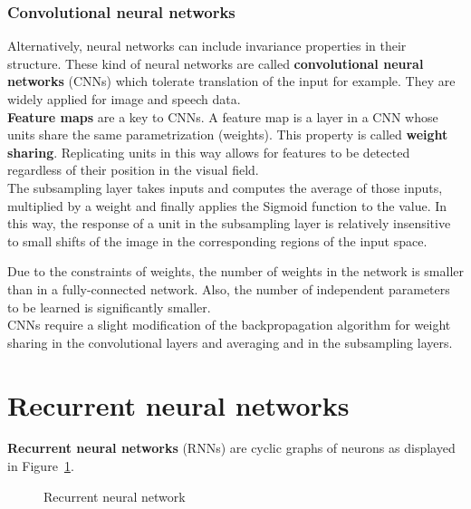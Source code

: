 \documentclass{report}
\begin{document}
\subsubsection{Convolutional neural networks}
Alternatively, neural networks can include invariance properties in their structure.
These kind of neural networks are called {\bf convolutional neural networks} (CNNs) which tolerate translation of the input for example.
They are widely applied for image and speech data. \\
{\bf Feature maps} are a key to CNNs. A feature map is a layer in a CNN whose units share the same parametrization (weights). This property is called {\bf weight sharing}.
Replicating units in this way allows for features to be detected regardless of their position in the visual field.\\
The subsampling layer takes inputs and computes the average of those inputs, multiplied by a weight and finally applies the Sigmoid function to the value.
In this way, the response of a unit in the subsampling layer is relatively insensitive to small shifts of the image in the corresponding regions of the input space.


Due to the constraints of weights, the number of weights in the network is smaller than in a fully-connected network.
Also, the number of independent parameters to be learned is significantly smaller. \\
CNNs require a slight modification of the backpropagation algorithm for weight sharing in the convolutional layers and averaging and in the subsampling layers.

\section{Recurrent neural networks}
{\bf Recurrent neural networks} (RNNs) are cyclic graphs of neurons as displayed in Figure~\ref{figure:recurrentneuralnetwork}.

\begin{figure}[h!]
\centering
{}
\caption{Recurrent neural network}
\label{figure:recurrentneuralnetwork}
\end{figure}
\end{document}

